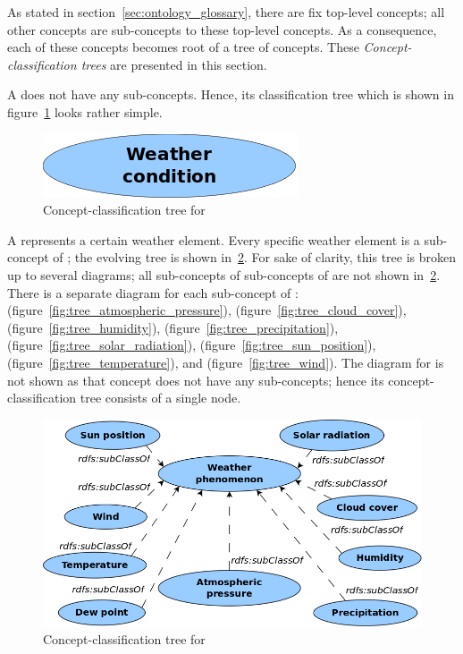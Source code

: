 As stated in section~\ref{sec:ontology_glossary}, there are fix top-level concepts; all other concepts are sub-concepts to these top-level concepts. As a consequence, each of these concepts becomes root of a tree of concepts. These \emph{Concept-classification trees} are presented in this section.

A  does not have any sub-concepts. Hence, its classification tree which is shown in figure~\ref{fig:tree_weather_condition} looks rather simple.

\begin{figure}
  \centering
  \includegraphics[width=.3\textwidth]{figures/diagrams/weather-condition.png}
  \caption{Concept-classification tree for }
  \label{fig:tree_weather_condition}
\end{figure}

A  represents a certain weather element. Every specific weather element is a sub-concept of ; the evolving tree is shown in~\ref{fig:tree_weather_phenomenon}. For sake of clarity, this tree is broken up to several diagrams; all sub-concepts of sub-concepts of  are not shown in~\ref{fig:tree_weather_phenomenon}. There is a separate diagram for each sub-concept of :  (figure~\ref{fig:tree_atmospheric_pressure}),  (figure~\ref{fig:tree_cloud_cover}),  (figure~\ref{fig:tree_humidity}),  (figure~\ref{fig:tree_precipitation}),  (figure~\ref{fig:tree_solar_radiation}),  (figure~\ref{fig:tree_sun_position}),  (figure~\ref{fig:tree_temperature}), and  (figure~\ref{fig:tree_wind}). The diagram for  is not shown as that concept does not have any sub-concepts; hence its concept-classification tree consists of a single node.

\begin{figure}
  \centering
  \includegraphics[width=.8\textwidth]{figures/diagrams/weather-phenomenon.png}
  \caption{Concept-classification tree for }
  \label{fig:tree_weather_phenomenon}
\end{figure}


